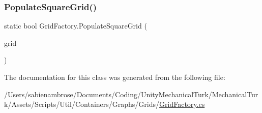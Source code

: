 \subsubsection{\texorpdfstring{Populate\+Square\+Grid()}{PopulateSquareGrid()}}
{\footnotesize\ttfamily static bool Grid\+Factory.\+Populate\+Square\+Grid (\begin{DoxyParamCaption}\item[{ref \mbox{\hyperlink{class_poly_grid}{Poly\+Grid}}}]{grid }\end{DoxyParamCaption})\hspace{0.3cm}{\ttfamily [static]}}



The documentation for this class was generated from the following file\+:\begin{DoxyCompactItemize}
\item 
/\+Users/sabienambrose/\+Documents/\+Coding/\+Unity\+Mechanical\+Turk/\+Mechanical\+Turk/\+Assets/\+Scripts/\+Util/\+Containers/\+Graphs/\+Grids/\mbox{\hyperlink{_grid_factory_8cs}{Grid\+Factory.\+cs}}\end{DoxyCompactItemize}
